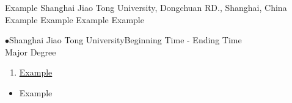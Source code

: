 \documentclass{Style_CV}
\begin{document}
\Header
    {Example} %
    {Shanghai Jiao Tong University, Dongchuan RD., Shanghai, China} %
    {Example}%
    {Example} %
    {Example} %
    {Example} %

$\bullet$\quad Shanghai Jiao Tong University\hfill Beginning Time - Ending Time\\
Major \hfill Degree\\

\begin{enumerate}
    \renewcommand{\labelenumi}{[\theenumi]}
    \item \href{Example Line}{Example}
\end{enumerate}


\begin{itemize}[leftmargin=*]
    \item Example
\end{itemize}

\end{document}
